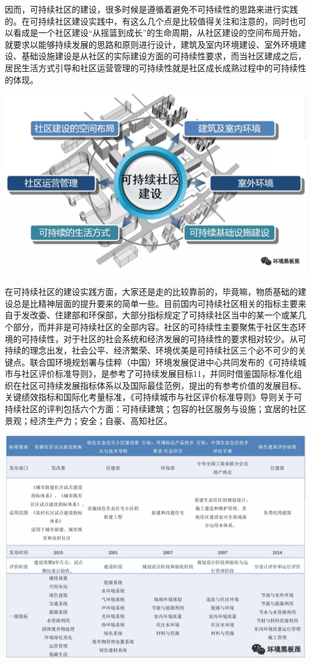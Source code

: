 \documentclass[
]{book}
\begin{document}
因而，可持续社区的建设，很多时候是遵循着避免不可持续性的思路来进行实践的。在可持续社区建设实践中，有这么几个点是比较值得关注和注意的，同时也可以看成是一个社区建设``从摇篮到成长''的生命周期，从社区建设的空间布局开始，就要求以能够持续发展的思路和原则进行设计，建筑及室内环境建设、室外环境建设、基础设施建设是从社区的实际建设方面的可持续性要求，而当社区建成之后，居民生活方式引导和社区运营管理的可持续性就是社区成长成熟过程中的可持续性的体现。

\includegraphics[width=8.33in]{images/moma3}

在可持续社区的建设实践方面，大家还是走的比较靠前的，毕竟嘛，物质基础的建设总是比精神层面的提升要来的简单一些。目前国内可持续社区相关的指标主要来自于发改委、住建部和环保部，大部分指标规定了可持续社区当中的某一个或某几个部分，而并非是可持续社区的全部内容。社区的可持续性主要聚焦于社区生态环境的可持续性，对于社区的社会系统和经济发展的可持续性的要求相对较少。从可持续的理念出发，社会公平、经济繁荣、环境优美是可持续社区三个必不可少的关键点。联合国环境规划署与佳粹（中国）环境发展促进中心共同发布的《可持续城市与社区评价标准导则》，是参考了可持续发展目标11，并同时借鉴国际标准化组织在社区可持续发展指标体系以及国际最佳范例，提出的有参考价值的发展目标、关键绩效指标和国际化考量标准，《可持续城市与社区评价标准导则》导则关于可持续社区的评判包括六个方面：可持续建筑；包容的社区服务与设施；宜居的社区景观；经济生产力；安全；自豪、高知社区。

\includegraphics[width=8.33in]{images/moma4}
\end{document}

